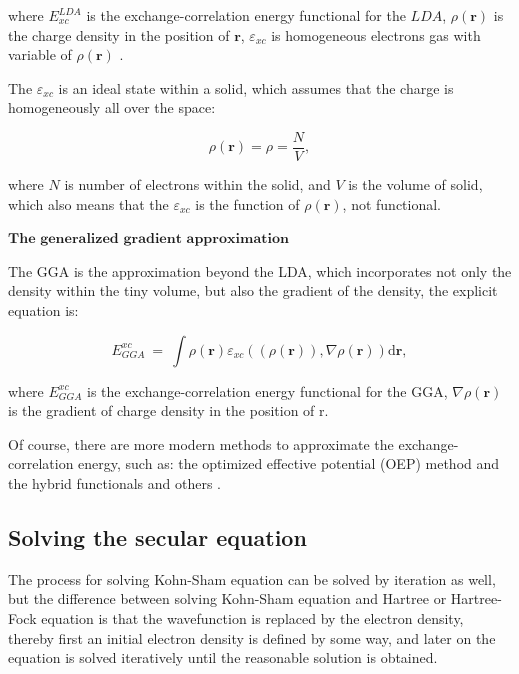 \documentclass[a4paper, 12pt, titlepage,oneside,drop]{kthesis}
\begin{document}
where $ E^\textit{LDA}_\textit{xc} $ is the exchange-correlation energy functional for the $LDA$, $\rho(\textbf{r})$ is the charge density in the position of $\textbf{r}$, $\varepsilon_\textit{xc}$ is homogeneous 
electrons gas with variable of  $\rho(\textbf{r})$ .

The $\varepsilon_\textit{xc}$ is an ideal state within a solid, which assumes that the charge is homogeneously all over the space:

\begin{equation}
 \rho(\textbf{r}) = \rho = \frac{N}{V},
\end{equation}

where $N$ is number of electrons within the solid, and $V$ is the volume of solid, which also means that the $\varepsilon_\textit{xc}$ is the function of $\rho(\textbf{r})$,
 not functional. 

$\textbf{The generalized gradient approximation}$

The GGA is the approximation beyond the LDA, which incorporates not only the density within the tiny volume, but also the gradient
 of the density, the explicit equation is:

\begin{equation}
E_{\textit{GGA}}^{\textit{xc}}\ = \ \int \rho(\textbf{r}) \varepsilon_\textit{xc}( (\rho(\textbf{r})), \nabla \rho(\textbf{r}) ) \mathrm{d} \textbf{r}, 
\end{equation}

where $E_{\textit{GGA}}^{\textit{xc}}$ is the exchange-correlation energy functional for the GGA, $\nabla \rho(\textbf{r})$ is the gradient  of charge density in the position of r.

Of course, there are more modern methods to approximate the exchange-correlation energy, such as: the optimized effective potential
(OEP) method and the hybrid functionals and others			.

\subsection{Solving the secular equation}

The process for solving Kohn-Sham equation can be solved by iteration as well, but the difference between solving Kohn-Sham 
equation and Hartree or Hartree-Fock equation is that the wavefunction is replaced by the electron density, thereby first an initial 
electron density is defined by some way, and later on the equation is solved iteratively until the reasonable solution is obtained.
\end{document}
